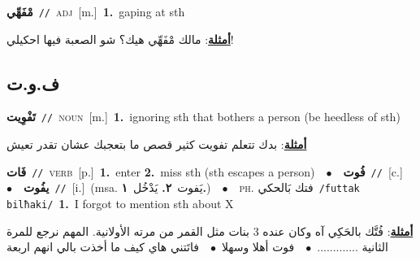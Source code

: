 \documentclass[10pt,a4paper,twoside]{article} %
\begin{document}
\begin{multicols}{2}
{\setlength\topsep{0pt}\textbf{\foreignlanguage{arabic}{مْفَهِّي}}\ {\color{gray}\texttt{//}\color{black}}\ \textsc{adj}\ [m.]\ \textbf{1.}~gaping at sth\  \begin{flushright}\color{gray}\foreignlanguage{arabic}{\textbf{\underline{\foreignlanguage{arabic}{أمثلة}}}: مالك مْفَهِّي هيك؟ شو الصعبة فيها احكيلي!}\end{flushright}\color{black}} \vspace{2mm}

\vspace{-3mm}
\subsection*{\color{blue}\foreignlanguage{arabic}{ف.و.ت}\color{blue}{}} 

{\setlength\topsep{0pt}\textbf{\foreignlanguage{arabic}{تَفْوِيت}}\ {\color{gray}\texttt{//}\color{black}}\ \textsc{noun}\ [m.]\ \textbf{1.}~ignoring sth that bothers a person (be heedless of sth)\  \begin{flushright}\color{gray}\foreignlanguage{arabic}{\textbf{\underline{\foreignlanguage{arabic}{أمثلة}}}: بدك تتعلم تفويت كثير قصص ما بتعجبك عشان تقدر تعيش}\end{flushright}\color{black}} \vspace{2mm}

{\setlength\topsep{0pt}\textbf{\foreignlanguage{arabic}{فَات}}\ {\color{gray}\texttt{//}\color{black}}\ \textsc{verb}\ [p.]\ \textbf{1.}~enter  \textbf{2.}~miss sth (sth escapes a person)\ \ $\bullet$\ \ \setlength\topsep{0pt}\textbf{\foreignlanguage{arabic}{فُوت}}\ {\color{gray}\texttt{//}\color{black}}\ [c.]\ \ $\bullet$\ \ \setlength\topsep{0pt}\textbf{\foreignlanguage{arabic}{يفُوت}}\ {\color{gray}\texttt{//}\color{black}}\ [i.]\ \color{gray}(msa. \foreignlanguage{arabic}{يَفوت}~\foreignlanguage{arabic}{\textbf{٢.}}  \foreignlanguage{arabic}{يَدْخُل}~\foreignlanguage{arabic}{\textbf{١.}})\color{black}\ \ $\bullet$\ \ \textsc{ph.} \color{gray} \foreignlanguage{arabic}{فتك بَالحكي}\color{black}\ {\color{gray}\texttt{/{\sffamily futtak bilħaki}/}\color{black}}\ \textbf{1.}~I forgot to mention sth about X\  \begin{flushright}\color{gray}\foreignlanguage{arabic}{\textbf{\underline{\foreignlanguage{arabic}{أمثلة}}}: فُتَّك بالحَكِي آه وكان عنده 3 بنات مثل القمر من مرته الأولانية. المهم نرجع للمرة الثانية .............\ $\bullet$\ \  فوت أهلا وسهلا\ $\bullet$\ \  فاتَتني هاي كيف ما أخذت بالي انهم اربعة}\end{flushright}\color{black}} \vspace{2mm}


\end{multicols}
\end{document}

